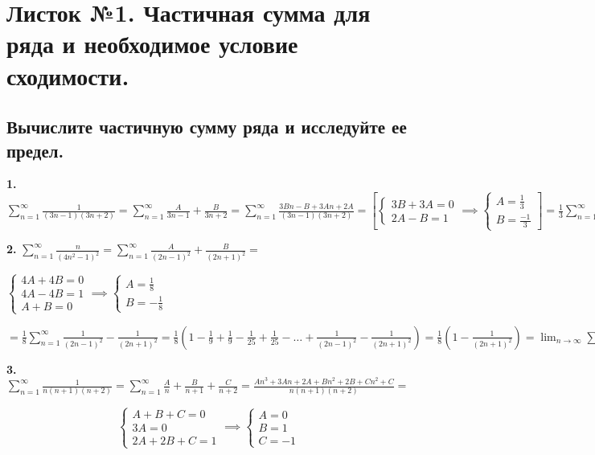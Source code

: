 \section{Листок №1. Частичная сумма для ряда и необходимое условие сходимости.}

\subsection{Вычислите частичную сумму ряда и исследуйте ее предел.}

\textbf{1.} $\sum_{n=1}^{\infty} \frac{1}{(3n-1)(3n+2)} = \sum_{n=1}^{\infty} \frac{A}{3n-1} + \frac{B}{3n+2} = \sum_{n=1}^{\infty} \frac{3Bn-B+3An+2A}{(3n-1)(3n+2)} = \left[ \begin{cases} 3B + 3A = 0\\ 2A - B = 1 \end{cases} \implies \begin{cases} A = \frac{1}{3} \\ B = \frac{-1}{3} \end{cases}  \right] = \frac{1}{3} \sum_{n=1}^{\infty} \frac{1}{3n-1} - \frac{1}{3n+2} = \frac{1}{3} (\frac{1}{2} - \frac{1}{5} + \frac{1}{5} - \frac{1}{8} + \frac{1}{8} - \dots + \frac{1}{3n-1} - \frac{1}{3n+2}) = \frac{1}{3} (\frac{1}{2} - \frac{1}{3n+2}) = \lim_{n \to \infty} \sum =  \frac{1}{6}$

\textbf{2.} $\sum_{n=1}^{\infty} \frac{n}{(4n^2-1)^2} = \sum_{n=1}^{\infty} \frac{A}{(2n-1)^2} + \frac{B}{(2n+1)^2} =$

$\begin{cases} 4A+4B = 0\\ 4A - 4B = 1\\ A + B = 0 \end{cases} \implies \begin{cases} A = \frac{1}{8}\\ B = -\frac{1}{8} \end{cases}$

$= \frac{1}{8} \sum_{n=1}^{\infty} \frac{1}{(2n-1)^2} - \frac{1}{(2n+1)^2} = \frac{1}{8} \left(1 - \frac{1}{9} + \frac{1}{9} - \frac{1}{25} + \frac{1}{25} - \dots + \frac{1}{(2n-1)^2} - \frac{1}{(2n+1)^2}\right) = \frac{1}{8} \left(1 - \frac{1}{(2n+1)^2}\right) = \lim_{n \to \infty} \sum = \frac{1}{8}$

\textbf{3.}  $\sum_{n=1}^{\infty} \frac{1}{n(n+1)(n+2)} = \sum_{n=1}^{\infty} \frac{A}{n} + \frac{B}{n+1} + \frac{C}{n+2} = \frac{An^3+3An+2A+Bn^2+2B+Cn^2+C}{n(n+1)(n+2)} = $

$$\begin{cases} A + B + C = 0\\ 3A = 0\\ 2A+2B+C=1 \end{cases} \implies \begin{cases} A = 0\\ B = 1\\ C=-1 \end{cases}$$

